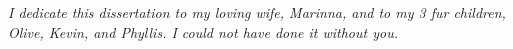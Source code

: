 \begin{center}
\emph{I dedicate this dissertation to my loving wife, Marinna, and to my 3 fur children, Olive, Kevin, and Phyllis. I could not have done it without you.}
\end{center}
